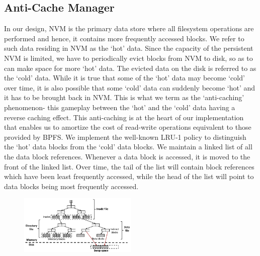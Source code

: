 \subsection{Anti-Cache Manager}
In our design, NVM is the primary data store where all filesystem operations are performed and hence, it contains more frequently accessed blocks. We refer to such data residing in NVM as the `hot' data. Since the capacity of the persistent NVM is limited, we have to periodically evict blocks from NVM to disk, so as to can make space for more `hot' data. The evicted data on the disk is referred to as the `cold' data. While it is true that some of the `hot' data may become `cold' over time, it is also possible that some `cold' data can suddenly become `hot' and it has to be brought back in NVM. This is what we term as the `anti-caching' phenomenon- this gameplay between the `hot' and the `cold' data having a reverse caching effect. This anti-caching is at the heart of our implementation that enables us to amortize the cost of read-write operations equivalent to those provided by BPFS. We implement the well-known LRU-1 policy to distinguish the `hot' data blocks from the `cold' data blocks. We maintain a linked list of all the data block references. Whenever a data block is accessed, it is moved to the front of the linked list. Over time, the tail of the list will contain block references which have been least frequently accessed, while the head of the list will point to data blocks being most frequently accessed.

\begin{figure}
\centering
\vspace{-0.2in}
\includegraphics[width=0.5\textwidth]{figs/bpfs2.pdf}
\vspace{-0.2in}
\end{figure}

